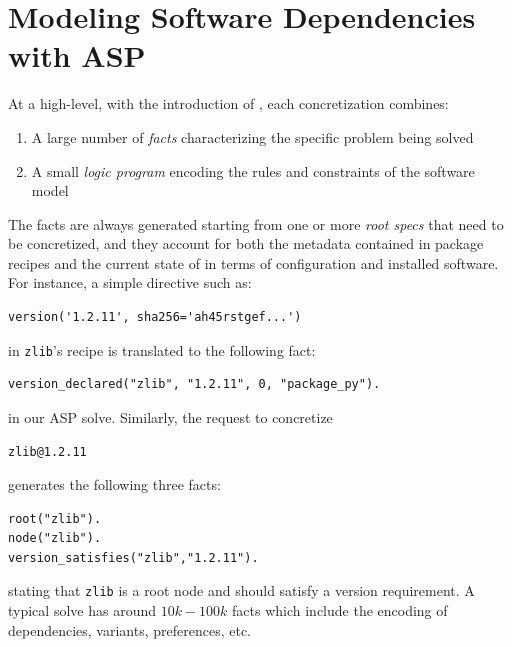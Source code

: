 \section{Modeling Software Dependencies with ASP}
\label{sec:asp-model}

At a high-level, with the introduction of \clingo, each concretization
combines:
\begin{enumerate}
\item A large number of \emph{facts} characterizing the specific problem being solved
\item A small \emph{logic program} encoding the rules and constraints of the software model
\end{enumerate}
The facts are always generated starting from one or more 
\emph{root specs} that need to be concretized, and they account 
for both the metadata contained in package recipes and the 
current state of \spack{} in terms of configuration and 
installed software.
For instance, a simple directive such as:
\begin{verbatim}
version('1.2.11', sha256='ah45rstgef...')
\end{verbatim}
in \texttt{zlib}'s recipe is translated to the following fact:
\begin{verbatim}
version_declared("zlib", "1.2.11", 0, "package_py").
\end{verbatim}
in our ASP solve. Similarly, the request to concretize
\begin{verbatim}
zlib@1.2.11
\end{verbatim}
generates the following three facts:
\begin{verbatim}
root("zlib").
node("zlib").
version_satisfies("zlib","1.2.11").
\end{verbatim}
stating that \texttt{zlib} is a root node and should satisfy
a version requirement.
A typical solve has around $10k-100k$ facts which include
the encoding of dependencies, variants, preferences, etc.


